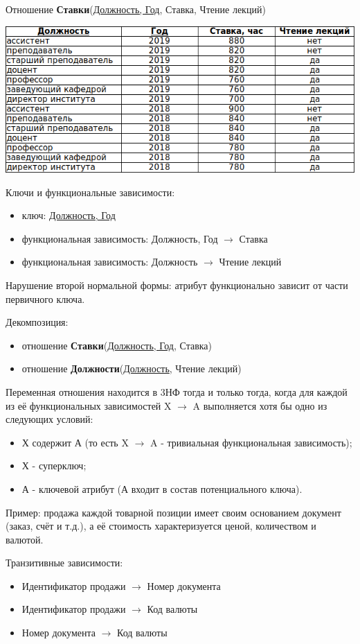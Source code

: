 \documentclass{beamer}
\begin{document}
\begin{frame}
Отношение \textbf{Ставки}(\underline{Должность, Год}, Ставка, Чтение лекций)
\begin{center}
\includegraphics[scale=1]{images/ex-rasp-07.png}
\end{center}
Ключи и функциональные зависимости:
\begin{itemize}
\item ключ: \underline{Должность, Год}
\item функциональная зависимость: Должность, Год $\rightarrow$ Ставка
\item функциональная зависимость: Должность $\rightarrow$ Чтение лекций
\end{itemize}
Нарушение второй нормальной формы: атрибут функционально зависит от части первичного ключа.

Декомпозиция:
\begin{itemize}
\item отношение \textbf{Ставки}(\underline{Должность, Год}, Ставка)
\item отношение \textbf{Должности}(\underline{Должность}, Чтение лекций)
\end{itemize}
\end{frame}

\begin{frame}
\begin{block}{Переменная отношения находится в 3НФ}
тогда и только тогда, когда для каждой из её функциональных зависимостей X $\rightarrow$ A выполняется хотя бы одно из следующих условий: 
\begin{itemize}
\item Х содержит А (то есть X $\rightarrow$ A - тривиальная функциональная зависимость);
\item Х - суперключ;
\item А - ключевой атрибут (А входит в состав потенциального ключа).
\end{itemize}
\end{block}
Пример: продажа каждой товарной позиции имеет своим основанием документ (заказ, счёт и т.д.), а её стоимость характеризуется ценой, количеством и валютой.

Транзитивные зависимости:
\begin{itemize}
\item Идентификатор продажи $\rightarrow$ Номер документа
\item Идентификатор продажи $\rightarrow$ Код валюты
\item Номер документа $\rightarrow$ Код валюты
\end{itemize}
\end{frame}
\end{document}
